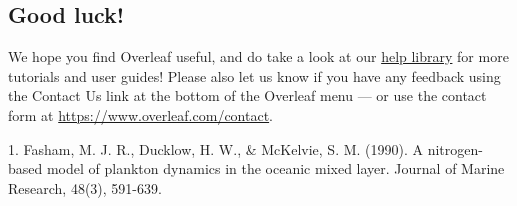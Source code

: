 \documentclass{article}
\begin{document}
\subsection{Good luck!}

We hope you find Overleaf useful, and do take a look at our \href{https://www.overleaf.com/learn}{help library} for more tutorials and user guides! Please also let us know if you have any feedback using the Contact Us link at the bottom of the Overleaf menu --- or use the contact form at \url{https://www.overleaf.com/contact}.




1. Fasham, M. J. R., Ducklow, H. W., & McKelvie, S. M. (1990). A nitrogen-based model of plankton dynamics in the oceanic mixed layer. Journal of Marine Research, 48(3), 591-639.
\end{document}
